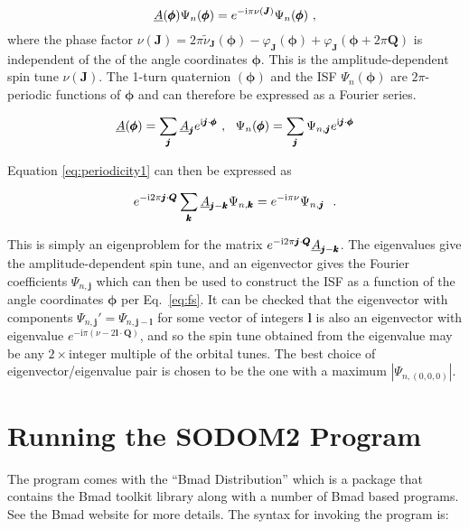 \documentclass{hitec}     %
\newcommand{\sodom}{\vn{sodom2}\xspace}
\begin{document}
\begin{equation}
    \textrm{\underbar{$A$}}(\pmb{\phi})\Psi_n(\pmb{\phi}) = e^{-\textrm{i}\pi\nu(\pmb{J})}\Psi_n(\pmb{\phi}) \ , \label{eq:periodicity1}
\end{equation}
where the phase factor $\nu(\pmb{J}) = 2\pi\tilde{\nu}_{\pmb{J}}(\pmb{\phi}) - \varphi_{\pmb{J}}(\pmb{\phi})+\varphi_{\pmb{J}}(\pmb{\phi}+2\pi\pmb{Q})$ is independent of the of the angle coordinates $\pmb{\phi}$. This is the amplitude-dependent spin tune $\nu(\pmb{J})$. The 1-turn quaternion $(\pmb{\phi})$ and the ISF $\Psi_n(\pmb{\phi})$ are $2\pi$-periodic functions of $\pmb{\phi}$ and can therefore be expressed as a Fourier series.

\begin{equation}
    \textrm{\underbar{$A$}}(\pmb{\phi})=\sum_{\pmb{j}}\textrm{\underbar{$A$}}_{\pmb{j}}e^{\textrm{i}\pmb{j}\cdot\pmb{\phi}} \ , \ \ \Psi_n(\pmb{\phi})=\sum_{\pmb{j}}\Psi_{n,\pmb{j}}e^{\textrm{i}\pmb{j}\cdot\pmb{\phi}} \label{eq:fs}
\end{equation}

Equation \eqref{eq:periodicity1} can then be expressed as

\begin{equation}
    e^{-\textrm{i}2\pi\pmb{j}\cdot\pmb{Q}}\sum_{\pmb{k}}\textrm{\underbar{$A$}}_{\pmb{j}-\pmb{k}}\Psi_{n,\pmb{k}}=e^{-\textrm{i}\pi\nu}\Psi_{n,\pmb{j}} \ \ .
\end{equation}

This is simply an eigenproblem for the matrix $e^{-\textrm{i}2\pi\pmb{j}\cdot\pmb{Q}}\textrm{\underbar{$A$}}_{\pmb{j}-\pmb{k}}$. The eigenvalues give the amplitude-dependent spin tune, and an eigenvector gives the Fourier coefficients $\Psi_{n,\pmb{j}}$ which can then be used to construct the ISF as a function of the angle coordinates $\pmb{\phi}$ per Eq.~\eqref{eq:fs}. It can be checked that the eigenvector with components $\Psi_{n,\pmb{j}}'=\Psi_{n,\pmb{j}-\pmb{l}}$ for some vector of integers $\pmb{l}$ is also an eigenvector with eigenvalue $e^{-\textrm{i}\pi(\nu-2\pmb{l}\cdot\pmb{Q})}$, and so the spin tune obtained from the eigenvalue may be any $2\times$integer multiple of the orbital tunes. The best choice of eigenvector/eigenvalue pair is chosen to be the one with a maximum $|\Psi_{n,(0,0,0)}|$.

\section{Running the SODOM2 Program}
The \sodom program comes with the ``Bmad Distribution'' which is a package that contains the Bmad toolkit
library along with a number of Bmad based programs. See the Bmad website for more details. The syntax for invoking the program is:
\end{document}
